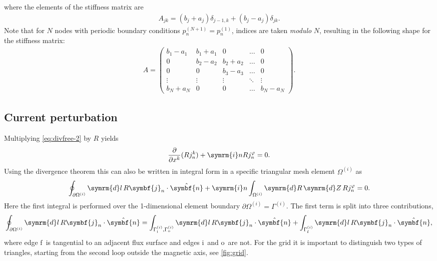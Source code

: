 \documentclass[a4paper, 10pt, english]{article}
\let\temp\vartheta
\let\vartheta\theta
\let\theta\temp
\let\temp\varphi
\let\varphi\phi
\let\phi\temp
\let\vec\symbf
\newcommand*\diff{\ensuremath{\symrm{d}}}  %
\newcommand*\im{\ensuremath{\symrm{i}}}  %
\newcommand*\pd[2][]{\ensuremath{\frac{\partial #1}{\partial #2}}}  %
\newcommand*\fs{\ensuremath{\textrm{f}}}  %
\newcommand*\inw{\ensuremath{\textrm{i}}}  %
\newcommand*\out{\ensuremath{\textrm{o}}}  %
\begin{document}
where the elements of the stiffness matrix are
\begin{gather}
  A_{jk} = (b_{j} + a_{j}) \delta_{j-1, k} + (b_{j} - a_{j}) \delta_{jk}.
\end{gather}
Note that for $N$ nodes with periodic boundary conditions $p_{n}^{(N+1)} = p_{n}^{(1)}$, indices are taken \emph{modulo} $N$, resulting in the following shape for the stiffness matrix:
\begin{gather*}
  A = \begin{pmatrix}
    b_{1} - a_{1} &  b_{1} + a_{1} &        0       & \hdots &    0   \\
           0       & b_{2} - a_{2} &  b_{2} + a_{2} & \hdots &    0   \\
           0       &        0       & b_{3} - a_{3} & \hdots &    0   \\
        \vdots     &     \vdots     &     \vdots     & \ddots & \vdots \\
     b_{N} + a_{N} &        0       &        0       & \hdots & b_{N} - a_{N}
  \end{pmatrix}.
\end{gather*}
    
\subsection{Current perturbation}

Multiplying \cref{eq:divfree-2} by $R$ yields
\begin{gather}
  \pd{x^{k}} (R j_{n}^{k}) + \im n R j_{n}^{\phi} = 0.
\end{gather}
Using the divergence theorem this can also be written in integral form in a specific triangular mesh element $\Omega^{(i)}$ as
\begin{gather}
  \oint_{\partial \Omega^{(i)}} \diff l \, R \vec{j}_{n} \cdot \hat{\vec{n}} + \im n \int_{\Omega^{(i)}} \diff R \, \diff Z \, R j_{n}^{\phi} = 0.
\end{gather}
Here the first integral is performed over the 1-dimensional element boundary $\partial \Omega^{(i)} = \Gamma^{(i)}$. The first term is split into three contributions,
\begin{gather}
  \oint_{\partial \Omega^{(i)}} \diff l \, R \vec{j}_{n} \cdot \hat{\vec{n}} = \int_{\Gamma_{\inw}^{(i)}, \Gamma_{\out}^{(i)}} \diff l \, R \vec{j}_{n} \cdot \hat{\vec{n}} + \int_{\Gamma_{\fs}^{(i)}} \diff l \, R \vec{j}_{n} \cdot \hat{\vec{n}}, \label{eq:integral law}
\end{gather}
where edge \fs\ is tangential to an adjacent flux surface and edges \inw\ and \out\ are not. For the grid it is important to distinguish two types of triangles, starting from the second loop outside the magnetic axis, see \cref{fig:grid}.
\end{document}
